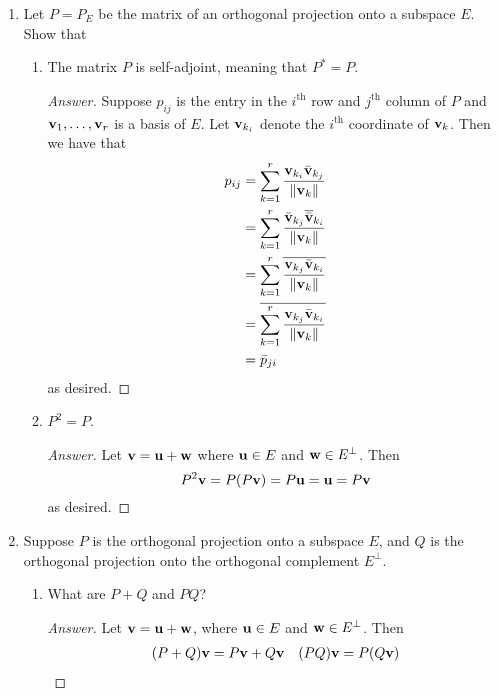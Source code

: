 \documentclass[../psets.tex]{subfiles}
\begin{document}
\begin{enumerate}[label={\textbf{3.\arabic*.}}]
    \item Let $P=P_E$ be the matrix of an orthogonal projection onto a subspace $E$. Show that
    \begin{enumerate}
        \item The matrix $P$ is self-adjoint, meaning that $P^*=P$.
        \begin{proof}[Answer]
            Suppose $p_{ij}$ is the entry in the $i^\text{th}$ row and $j^\text{th}$ column of $P$ and $\mathbf{v}_1,\dots,\mathbf{v}_r$ is a basis of $E$. Let $\mathbf{v}_{k_i}$ denote the $i^\text{th}$ coordinate of $\mathbf{v}_k$. Then we have that
            \begingroup
            \allowdisplaybreaks
            \begin{align*}
                p_{ij} &= \sum_{k=1}^r\frac{\mathbf{v}_{k_i}\bar{\mathbf{v}}_{k_j}}{\norm{\mathbf{v}_k}}\\
                &= \sum_{k=1}^r\frac{\bar{\mathbf{v}}_{k_j}\overline{\bar{\mathbf{v}}}_{k_i}}{\norm{\mathbf{v}_k}}\\
                &= \sum_{k=1}^r\overline{\frac{\mathbf{v}_{k_j}\bar{\mathbf{v}}_{k_i}}{\norm{\mathbf{v}_k}}}\\
                &= \overline{\sum_{k=1}^r\frac{\mathbf{v}_{k_j}\bar{\mathbf{v}}_{k_i}}{\norm{\mathbf{v}_k}}}\\
                &= \bar{p}_{ji}
            \end{align*}
            \endgroup
            as desired.
        \end{proof}
        \item $P^2=P$.
        \begin{proof}[Answer]
            Let $\mathbf{v}=\mathbf{u}+\mathbf{w}$ where $\mathbf{u}\in E$ and $\mathbf{w}\in E^\perp$. Then
            \begin{equation*}
                P^2\mathbf{v} = P(P\mathbf{v}) = P\mathbf{u} = \mathbf{u} = P\mathbf{v}
            \end{equation*}
            as desired.
        \end{proof}
    \end{enumerate}
    \item Suppose $P$ is the orthogonal projection onto a subspace $E$, and $Q$ is the orthogonal projection onto the orthogonal complement $E^\perp$.
    \begin{enumerate}
        \item What are $P+Q$ and $PQ$?
        \begin{proof}[Answer]
            Let $\mathbf{v}=\mathbf{u}+\mathbf{w}$, where $\mathbf{u}\in E$ and $\mathbf{w}\in E^\perp$. Then
            \begin{align*}
                (P+Q)\vm &= P\vm+Q\vm&
                    (PQ)\vm &= P(Q\vm)\\

\end{align*}
\end{proof}
\end{enumerate}
\end{enumerate}
\end{document}
